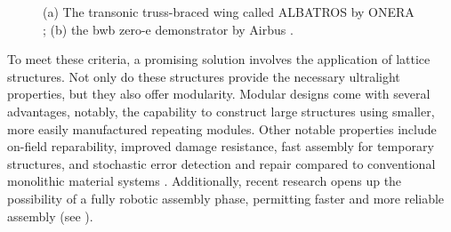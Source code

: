 \begin{figure}
    \hspace*{\fill}
    \hfill
    \hspace*{\fill}
    \caption{(a) The transonic truss-braced wing called ALBATROS by ONERA \cite{carrier_investigation_2012,carrier_multidisciplinary_2021}; (b) the \acrfull{bwb} zero-e demonstrator by Airbus \cite{noauthor_airbus_2021}.}
    \label{fig:01_concepts}
\end{figure}

To meet these criteria, a promising solution involves the application of lattice structures. Not only do these structures provide the necessary ultralight properties, but they also offer modularity. Modular designs come with several advantages, notably, the capability to construct large structures using smaller, more easily manufactured repeating modules. Other notable properties include on-field reparability, improved damage resistance, fast assembly for temporary structures, and stochastic error detection and repair compared to conventional monolithic material systems . Additionally, recent research opens up the possibility of a fully robotic assembly phase, permitting faster and more reliable assembly (see ).

